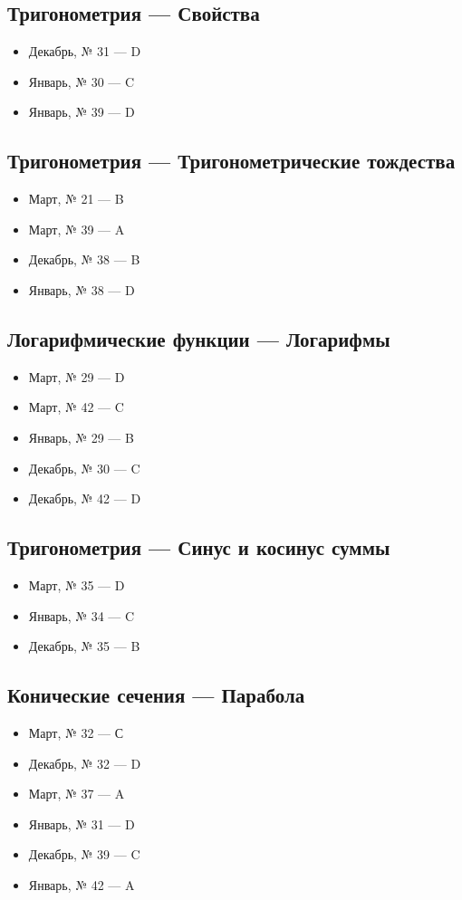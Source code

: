 \subsection*{Тригонометрия — Свойства}
\begin{itemize}
\item Декабрь, № 31 — D
\item Январь, № 30 — C
\item Январь, № 39 — D
\end{itemize}

\subsection*{Тригонометрия — Тригонометрические тождества}
\begin{itemize}
\item Март, № 21 — B
\item Март, № 39 — A
\item Декабрь, № 38 — B
\item Январь, № 38 — D
\end{itemize}

\subsection*{Логарифмические функции — Логарифмы}
\begin{itemize}
\item Март, № 29 — D
\item Март, № 42 — C
\item Январь, № 29 — B
\item Декабрь, № 30 — C
\item Декабрь, № 42 — D
\end{itemize}

\subsection*{Тригонометрия — Синус и косинус суммы}
\begin{itemize}
\item Март, № 35 — D
\item Январь, № 34 — C
\item Декабрь, № 35 — B
\end{itemize}

\subsection*{Конические сечения — Парабола}
\begin{itemize}
\item Март, № 32 — С
\item Декабрь, № 32 — D
\item Март, № 37 — A
\item Январь, № 31 — D
\item Декабрь, № 39 — C
\item Январь, № 42 — A
\end{itemize}


